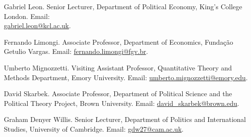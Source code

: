 \documentclass[a4paper]{article}
\renewenvironment{itemize}{
	\begin{list}{}{
			\setlength{\leftmargin}{1.5em}
		}
		}{
	\end{list}
}
\begin{document}
\begin{itemize}

\item Gabriel Leon. Senior Lecturer, Department of Political Economy, King's College London. Email: \\ \href{mailto:gabriel.leon@kcl.ac.uk}{gabriel.leon@kcl.ac.uk}.
\item Fernando Limongi. Associate Professor, Department of Economics, Fundação Getulio Vargas. Email: \href{mailto:fernando.limongi@fgv.br}{fernando.limongi@fgv.br}.
\item Umberto Mignozzetti. Visiting Assistant Professor, Quantitative Theory and Methods Department, Emory University. Email: \href{mailto:umberto.mignozzetti@emory.edu}{umberto.mignozzetti@emory.edu}.
\item David Skarbek. Associate Professor, Department of Political Science and the Political Theory Project, Brown University. Email: \href{mailto:davidskarbek@gmail.com}{david\_skarbek@brown.edu}.
\item Graham Denyer Willis. Senior Lecturer, Department of Politics and International Studies, University of Cambridge. Email: \href{mailto:gdw27@cam.ac.uk}{gdw27@cam.ac.uk}.
\end{itemize}

	\bigskip


	
\end{document}
